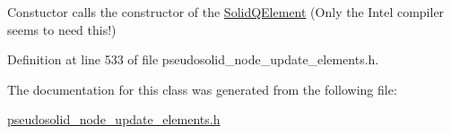Constuctor calls the constructor of the \hyperlink{classoomph_1_1SolidQElement}{Solid\+Q\+Element} (Only the Intel compiler seems to need this!) 



Definition at line 533 of file pseudosolid\+\_\+node\+\_\+update\+\_\+elements.\+h.



The documentation for this class was generated from the following file\+:\begin{DoxyCompactItemize}
\item 
\hyperlink{pseudosolid__node__update__elements_8h}{pseudosolid\+\_\+node\+\_\+update\+\_\+elements.\+h}\end{DoxyCompactItemize}
